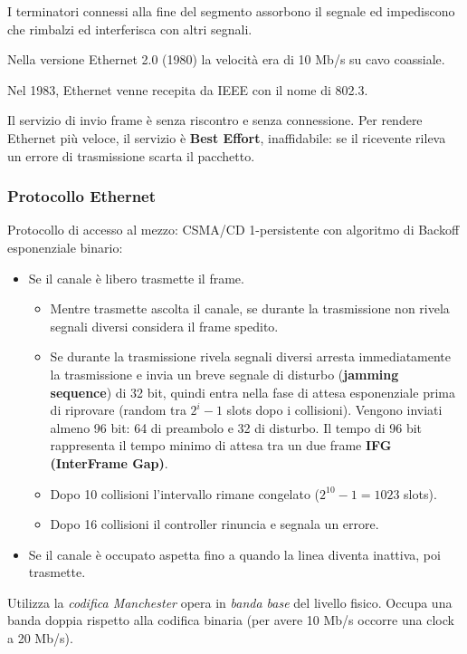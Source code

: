         I terminatori connessi alla fine del segmento assorbono il segnale ed impediscono che rimbalzi ed interferisca con altri segnali.
    
        Nella versione Ethernet 2.0 (1980) la velocità era di 10 Mb/s su cavo coassiale.

        Nel 1983, Ethernet venne recepita da IEEE con il nome di 802.3.

        Il servizio di invio frame è senza riscontro e senza connessione. Per rendere Ethernet più veloce, il servizio è \textbf{Best Effort}, inaffidabile: se il ricevente rileva un errore di trasmissione scarta il pacchetto.

        \subsubsection{Protocollo Ethernet}
            Protocollo di accesso al mezzo: CSMA/CD 1-persistente con algoritmo di Backoff esponenziale binario:
            \begin{itemize}
                \item Se il canale è libero trasmette il frame.
                \begin{itemize}
                    \item Mentre trasmette ascolta il canale, se durante la trasmissione non rivela segnali diversi considera il frame spedito.
                    \item Se durante la trasmissione rivela segnali diversi arresta immediatamente la trasmissione e invia un breve segnale di disturbo (\textbf{jamming sequence}) di 32 bit, quindi entra nella fase di attesa esponenziale prima di riprovare (random tra $2^i - 1$ slots dopo i collisioni). Vengono inviati almeno 96 bit: 64 di preambolo e 32 di disturbo. Il tempo di 96 bit rappresenta il tempo minimo di attesa tra un due frame \textbf{IFG (InterFrame Gap)}.
                    \item Dopo 10 collisioni l'intervallo rimane congelato ($2^{10} - 1 = 1023$ slots).
                    \item Dopo 16 collisioni il controller rinuncia e segnala un errore.
                \end{itemize}
                \item Se il canale è occupato aspetta fino a quando la linea diventa inattiva, poi trasmette.
            \end{itemize}

            Utilizza la \textit{codifica Manchester} opera in \textit{banda base} del livello fisico. Occupa una banda doppia rispetto alla codifica binaria (per avere 10 Mb/s occorre una clock a 20 Mb/s).

